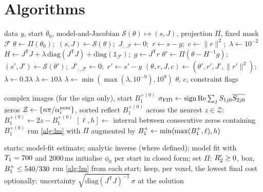 \section{Algorithms}\label{app:algorithms}

\begin{algorithm}[!htbp]
\caption{Projected Levenberg--Marquardt with exact Jacobian (batched over voxels)}
\label{alg:lm}
\begin{algorithmic}[1]
\Require data $y$, start $\theta_0$, model-and-Jacobian $\mathcal S(\theta)\mapsto(s,J)$, projection $\Pi$, fixed mask $\mathcal F$
\State $\theta\gets\Pi(\theta_0)$;\ $(s,J)\gets\mathcal S(\theta)$;\ $J_{:,\mathcal F}\gets0$;\ $r\gets s-y$;\ $c\gets\|r\|^2$;\ $\lambda\gets10^{-2}$
  \State $H\gets J^{\mathsf T}J+\lambda\,\mathrm{diag}(J^{\mathsf T}J)+\mathrm{diag}(\mathbb 1_{\mathcal F})$;\ $g\gets J^{\mathsf T}r$
  \State $\theta'\gets\Pi(\theta-H^{-1}g)$;\ $(s',J')\gets\mathcal S(\theta')$;\ $J'_{:,\mathcal F}\gets0$;\ $r'\gets s'-y$
   \State $(\theta,r,J,c)\gets(\theta',r',J',\|r'\|^2)$;\ $\lambda\gets0.3\lambda$
  \Else \State $\lambda\gets10\lambda$ \EndIf
  \State $\lambda\gets\min(\max(\lambda,10^{-9}),10^9)$
\EndFor
\State \Return $\theta$, $c$, constraint flags
\end{algorithmic}
\end{algorithm}

\begin{algorithm}[!htbp]
\caption{FID-sign branch constraint for the magnitude fit}
\label{alg:branch}
\begin{algorithmic}[1]
\Require complex images (for the sign only), start $B_1^{+(0)}$
\State $\sigma_{\rm FID}\gets\operatorname{sign}\operatorname{Re}\sum_jS_{1j0}\overline{S_{2j0}}$ 
\State zeros $\mathcal Z\gets\{n\pi/\alpha_i^{\rm nom}\}$, sorted
  \State reflect $B_1^{+(0)}$ across the nearest $z\in\mathcal Z$: $B_1^{+(0)}\gets2z-B_1^{+(0)}$
\EndIf
\State $[\ell,h]\gets$ interval between consecutive zeros containing $B_1^{+(0)}$
\State run \cref{alg:lm} with $\Pi$ augmented by $B_1^{+}\gets\min(\max(B_1^{+},\ell),h)$
\end{algorithmic}
\end{algorithm}

\begin{algorithm}[!htbp]
\caption{ML estimation with multiple starts}
\label{alg:ml}
\begin{algorithmic}[1]
\State starts: model-fit estimate; analytic inverse (where defined); model fit with $T_1=700$ and $2000$\,ms
\State initialise $\phi_0$ per start in closed form; set $\Pi$: $R_2'\ge0$, box, $B_1^{+}\le540/330$
\State run \cref{alg:lm} from each start; keep, per voxel, the lowest final cost
\State optionally: uncertainty $\sqrt{\mathrm{diag}(J^{\mathsf T}J)^{-1}}\,\sigma$ at the solution
\end{algorithmic}
\end{algorithm}

